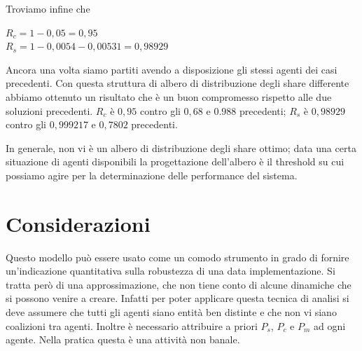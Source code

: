 Troviamo infine che
\begin{tightcenter}
	$ R_c = 1 - 0,05 = 0,95 $\\
	$ R_s = 1 - 0,0054 - 0,00531 = 0,98929 $
\end{tightcenter}

Ancora una volta siamo partiti avendo a disposizione gli stessi
agenti dei casi precedenti. Con questa struttura di
albero di distribuzione degli share differente abbiamo ottenuto un risultato che
è un buon compromesso rispetto alle due soluzioni precedenti.
$ R_c $ è $ 0,95 $ contro gli $ 0,68 $ e $ 0.988 $ precedenti;
$ R_s $ è $ 0,98929 $ contro gli $ 0,999217 $ e $ 0,7802 $ precedenti.

In generale, non vi è un albero di distribuzione degli share ottimo; data una certa
situazione di agenti disponibili la progettazione dell'albero è il threshold su
cui possiamo agire per la determinazione delle performance del sistema.

\section{Considerazioni}
Questo modello può essere usato come un comodo strumento in grado di fornire
un'indicazione quantitativa sulla robustezza di una data implementazione.
Si tratta però di una approssimazione,
che non tiene conto di alcune dinamiche che si possono venire a creare. Infatti per poter
applicare questa tecnica di analisi si deve assumere che tutti gli agenti siano entità ben distinte
e che non vi siano coalizioni tra agenti. Inoltre è necessario attribuire a priori
$ P_s $, $ P_c $ e $ P_m $ ad ogni agente. Nella pratica questa è una attività non banale.





